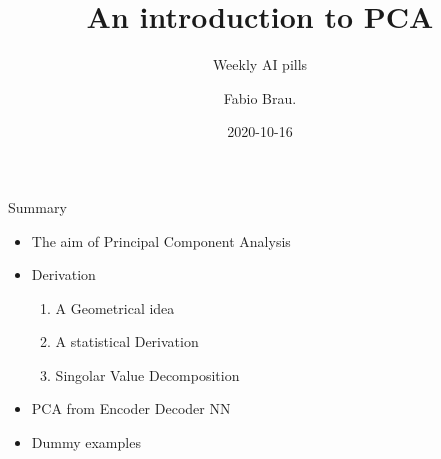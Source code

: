 \documentclass[10pt]{beamer}
\title{An introduction to PCA}
\subtitle{Weekly AI pills}
\date{2020-10-16}
\author{Fabio Brau.}
\institute{SSSA, Emerging Digital Technologies, Pisa.}
\theoremstyle{definition}
\newcommand{\1}{\mathbbm{1}}
\begin{document}
{%
\maketitle
}
\begin{frame}{Summary}
  \begin{itemize}
    \item The aim of Principal Component Analysis
    \item Derivation
      \begin{enumerate}
          \item A Geometrical idea
          \item A statistical Derivation
          \item Singolar Value Decomposition
      \end{enumerate}
    \item PCA from Encoder Decoder NN
    \item Dummy examples
  \end{itemize}
\end{frame}
\end{document}
